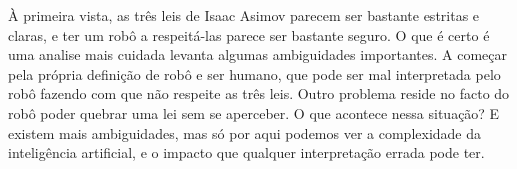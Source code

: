 \documentclass[runningheads,a4paper]{llncs}
\begin{document}
À primeira vista, as três leis de Isaac Asimov parecem ser bastante estritas e claras, e ter um robô a respeitá-las parece ser bastante seguro. O que é certo é uma analise mais cuidada levanta algumas ambiguidades importantes. A começar pela própria definição de robô e ser humano, que pode ser mal interpretada pelo robô fazendo com que não respeite as três leis. Outro problema reside no facto do robô poder quebrar uma lei sem se aperceber. O que acontece nessa situação? E existem mais ambiguidades, mas só por aqui podemos ver a complexidade da inteligência artificial, e o impacto que qualquer interpretação errada pode ter.

\begin{thebibliography}{4}

\end{thebibliography}
\end{document}

